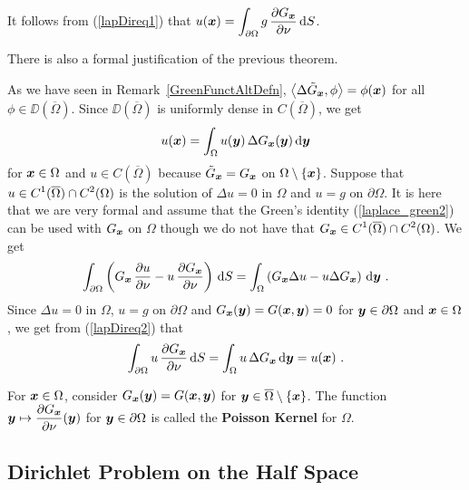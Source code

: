 It follows from (\ref{lapDireq1}) that
$\displaystyle u({\bm{x}}) = \int_{\partial \Omega}
g\,\frac{\partial{G_{{\bm{x}}}}}{\partial \nu} \,\mathrm{d}{S}$.

\begin{rmk}
There is also a formal justification of the previous theorem.

As we have seen in Remark~\ref{GreenFunctAltDefn},
$\displaystyle \left\langle{\Delta \tilde{G}_{{\bm{x}}}} , {\phi}\right\rangle = \phi({\bm{x}})$
for all $\phi \in \DD(\overline{\Omega})$.
Since $\DD(\overline{\Omega})$ is uniformly dense in
$C(\overline{\Omega})$, we get
\begin{equation} \label{lapDireq2}
u({\bm{x}}) = \int_\Omega u({\bm{y}})\,\Delta G_{{\bm{x}}}({\bm{y}})
\,\mathrm{d}{{\bm{y}}}
\end{equation}
for ${\bm{x}} \in \Omega$ and $u \in C(\overline{\Omega})$
because $\tilde{G}_{{\bm{x}}} = G_{{\bm{x}}}$
on $\Omega \setminus \{{\bm{x}}\}$.
Suppose that
$\displaystyle u \in C^1(\overline{\Omega}) \cap C^2(\Omega)$ is the
solution of $\Delta u = 0$ in $\Omega$ and $u=g$ on $\partial \Omega$.
It is here that we are very formal and assume that
the Green's identity (\ref{laplace_green2}) can be used with
$G_{{\bm{x}}}$ on $\Omega$ though we do not have that
$\displaystyle G_{{\bm{x}}} \in C^1(\overline{\Omega}) \cap C^2(\Omega)$.
We get
\[
\int_{\partial \Omega} \left( G_{{\bm{x}}}\,\frac{\partial{u}}{\partial \nu} 
- u\,\frac{\partial{G_{{\bm{x}}}}}{\partial \nu} \right) \,\mathrm{d}{S}
= \int_\Omega \left( G_{{\bm{x}}} \Delta u -
u \Delta G_{{\bm{x}}} \right)\,\mathrm{d}{{\bm{y}}} \ .
\]
Since $\Delta u = 0$ in $\Omega$, $u = g$ on $\partial \Omega$ and
$G_{{\bm{x}}}({\bm{y}}) = G({\bm{x}},{\bm{y}}) = 0$ for
${\bm{y}} \in \partial \Omega$ and ${\bm{x}} \in \Omega$,
we get from (\ref{lapDireq2}) that
\[
\int_{\partial \Omega} u\, \pdydx{G_{\VEC{x}}}{\nu} \dx{S}
= \int_\Omega u\, \Delta G_{\VEC{x}} \dx{\VEC{y}} = u(\VEC{x})  \ .
\]
\end{rmk}

\begin{defn}
For ${\bm{x}} \in \Omega$, consider
$\displaystyle G_{{\bm{x}}}({\bm{y}}) = G({\bm{x}},{\bm{y}})$ for
${\bm{y}} \in \overline{\Omega} \setminus \{{\bm{x}}\}$.  The function
$\displaystyle {\bm{y}} \mapsto \frac{\partial{G_{{\bm{x}}}}}{\partial \nu}({\bm{y}})$
for ${\bm{y}}\in \partial \Omega$ is called the
{\bfseries Poisson Kernel} for $\Omega$.
\end{defn}

\subsection{Dirichlet Problem on the Half Space}


